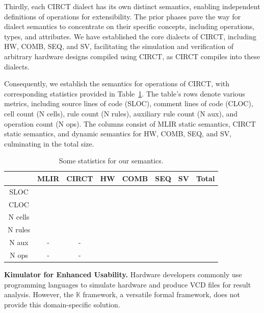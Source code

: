 Thirdly, each CIRCT dialect has its own distinct semantics, enabling independent definitions of operations for extensibility. The prior phases pave the way for dialect semantics to concentrate on their specific concepts, including operations, types, and attributes. We have established the core dialects of CIRCT, including HW, COMB, SEQ, and SV, facilitating the simulation and verification of arbitrary hardware designs compiled using CIRCT, as CIRCT compiles into these dialects.


Consequently, we establish the semantics for  operations of CIRCT, with corresponding statistics provided in Table~\ref{tab:statistics}. The table's rows denote various metrics, including source lines of code (SLOC), comment lines of code (CLOC), cell count (N cells), rule count (N rules), auxiliary rule count (N aux), and operation count (N ops). The columns consist of MLIR static semantics, CIRCT static semantics, and dynamic semantics for HW, COMB, SEQ, and SV, culminating in the total size.

\begin{table}[!h]
    \centering
    \begin{tabular}{c|c|c|c|c|c|c|c}
               & MLIR & CIRCT & HW & COMB & SEQ & SV & Total \\ \hline
       SLOC    & \red{???} & \red{???} & \red{???} & \red{???} & \red{???} & \red{???} & \red{???} \\ 
       CLOC    & \red{???} & \red{???} & \red{???} & \red{???} & \red{???} & \red{???} & \red{???} \\ 
       N cells & \red{???} & \red{???} & \red{???} & \red{???} & \red{???} & \red{???} & \red{???} \\ 
       N rules & \red{???} & \red{???} & \red{???} & \red{???} & \red{???} & \red{???} & \red{???} \\ 
       N aux & - & - & \red{???} & \red{???} & \red{???} & \red{???} & \red{???} \\
       N ops & - & - & \red{???} & \red{???} & \red{???} & \red{???} & \red{???} \\ 
    \end{tabular}
    \caption{Some statistics for our semantics.}
    \label{tab:statistics}
\end{table}

\smallskip
\textbf{Kimulator for Enhanced Usability.}
Hardware developers commonly use programming languages to simulate hardware and produce VCD files for result analysis. However, the $\mathbb{K}$ framework, a versatile formal framework, does not provide this domain-specific solution.

